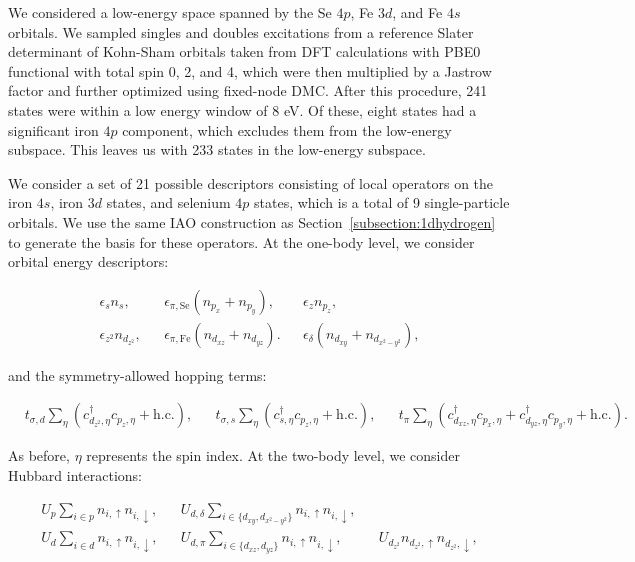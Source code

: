 We considered a low-energy space spanned by the Se $4p$, Fe $3d$, and Fe $4s$ orbitals. We sampled singles and doubles excitations from a reference Slater determinant 
of Kohn-Sham orbitals taken from DFT calculations with PBE0 functional with total spin 0, 2, and 4, which were then multiplied by a Jastrow factor and further optimized using fixed-node DMC. 
After this procedure, 241 states were within a low energy window of 8 eV. 
Of these, eight states had a significant iron $4p$ component, which excludes them from the low-energy subspace. 
This leaves us with 233 states in the low-energy subspace.

We consider a set of 21 possible descriptors consisting of local operators on the iron $4s$, iron $3d$ states, and selenium $4p$ states, which is a total of 9 single-particle orbitals.
We use the same IAO construction as Section~\ref{subsection:1dhydrogen} to generate the basis for these operators.
At the one-body level, we consider orbital energy descriptors: 

\begin{align}
  &\epsilon_{s} n_s,&
  &\epsilon_{\pi,\mathrm{Se}} (n_{p_x} + n_{p_y}), &
  &\epsilon_{z} n_{p_z},&
  \nonumber \\
  &\epsilon_{z^2} n_{d_{z^2}},& 
  &\epsilon_{\pi,\mathrm{Fe}} (n_{d_{xz}} + n_{d_{yz}}).& 
  &\epsilon_{\delta} (n_{d_{xy}} + n_{d_{x^2-y^2}}),&
\end{align}

and the symmetry-allowed hopping terms:

\begin{align}
  &t_{\sigma,d} \sum_{\eta} \left( c_{d_{z^2},\eta}^{\dagger} c_{p_z,\eta} + \text{h.c.} \right),&
  &t_{\sigma,s} \sum_{\eta} \left(c_{s,\eta}^{\dagger}  c_{p_z,\eta} + \text{h.c.} \right),&
  &t_{\pi} \sum_{\eta} \left(c_{d_{xz},\eta}^{\dagger}  c_{p_x,\eta} + c_{d_{yz},\eta}^{\dagger}  c_{p_y,\eta} + \text{h.c.} \right).&
\end{align}

As before, $\eta$ represents the spin index. At the two-body level, we consider Hubbard interactions:

\begin{align}
  &U_p \sum_{i \in p} n_{i,\uparrow} n_{i,\downarrow},&
  &U_{d,\delta} \sum_{i\in \{d_{xy},d_{x^2-y^2}\}} n_{i,\uparrow} n_{i,\downarrow},&
  \nonumber \\
  &U_d \sum_{i \in d} n_{i,\uparrow} n_{i,\downarrow},&
  &U_{d,\pi} \sum_{i\in \{d_{xz},d_{yz}\}} n_{i,\uparrow} n_{i,\downarrow},&
  &U_{d_{z^2}} n_{d_{z^2},\uparrow} n_{d_{z^2},\downarrow},&
\end{align}

